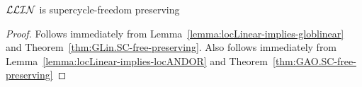 \begin{theorem} \label{thm:LLin.SC-free-preserving}
$\mathcal{LLIN}$ is supercycle-freedom preserving
\end{theorem}
%
\begin{proof}
Follows immediately from
Lemma~\ref{lemma:locLinear-implies-globlinear} and
Theorem~\ref{thm:GLin.SC-free-preserving}.
%
Also follows immediately from Lemma~\ref{lemma:locLinear-implies-locANDOR} and Theorem~\ref{thm:GAO.SC-free-preserving}
\end{proof}